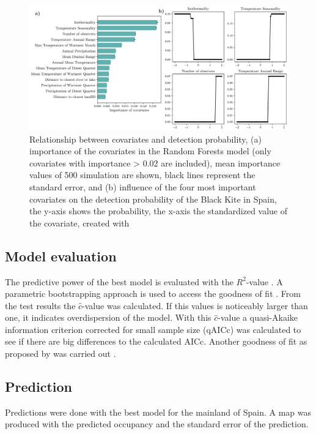 \begin{multicols}{2}
\begin{figure}[t]
	\centering
	\includegraphics[width=\linewidth]{img/random_forest}
	\caption{Relationship between covariates and detection probability, (a) importance of the covariates in the Random Forests model (only covariates with importance > 0.02 are included), mean importance values of 500 simulation are shown, black lines represent the standard error, and (b) influence of the four most important covariates on the detection probability of the Black Kite in Spain, the y-axis shows the probability, the x-axis the standardized value of the covariate, created with \textcite{matplotlib}}
	\label{fig:random_forest}
\end{figure}


\subsection*{Model evaluation}
The predictive power of the best model is evaluated with the $R^2$-value \parencite{Nagelkerke1991}. A parametric bootstrapping approach is used to access the goodness of fit \parencite["parboot" function as implemented in][]{unmarked}. From the test results the $\hat{c}$-value was calculated. If this values is noticeably larger than one, it indicates overdispersion of the model. With this $\hat{c}$-value a quasi-Akaike information criterion corrected for small sample size (qAICc) was calculated to see if there are big differences to the calculated AICc. Another goodness of fit as proposed by \textcite{MacKenzie2004} was carried out \parencite[implemented in][]{AICcmodavg}.


\subsection*{Prediction}
Predictions were done with the best model for the mainland of Spain. A map was produced with the predicted occupancy and the standard error of the prediction.
 

\end{multicols}
